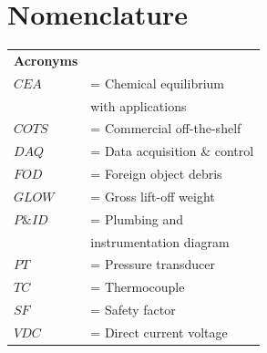 \documentclass[9pt]{article} %
\numberwithin{equation}{section} %
\begin{document}
\section{Nomenclature} \label{sec: nomenclature}
\vspace{0.1cm}
\begin{tabular}{ll}
\textbf{Acronyms} \\ 
$CEA $ & = \quad Chemical equilibrium \\ 
$ $ & \qquad \enskip with applications \\
$COTS $ & = \quad Commercial off-the-shelf \\
$DAQ $ & = \quad Data acquisition \& control \\
$FOD $ & = \quad Foreign object debris \\
$GLOW $ & = \quad Gross lift-off weight \\
$P\&ID $ & = \quad Plumbing and \\
$ $ & \qquad \enskip instrumentation diagram\\
$PT $ & = \quad Pressure transducer \\
$TC $ & = \quad Thermocouple \\
$SF $ & = \quad Safety factor \\
$VDC $ & = \quad Direct current voltage \\
\end{tabular} \newline
\end{document}
